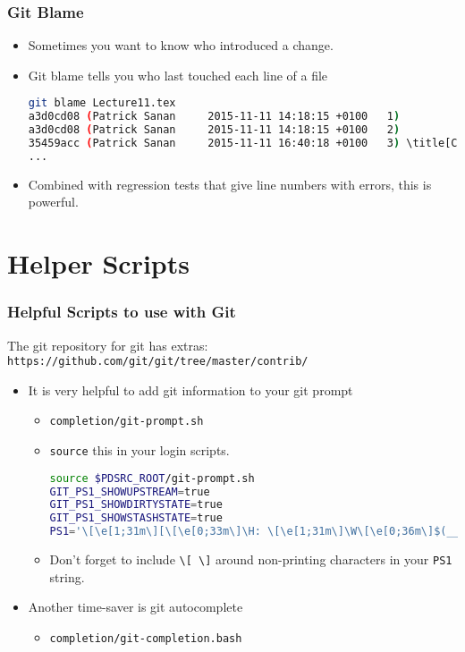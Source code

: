 \documentclass{beamer}
\begin{document}
\begin{frame}[fragile]
\frametitle{Git Blame}
\begin{itemize}
\item Sometimes you want to know who introduced a change.
\item Git blame tells you who last touched each line of a file
\begin{lstlisting}[language=bash,
basicstyle=\tiny\ttfamily]
git blame Lecture11.tex
a3d0cd08 (Patrick Sanan     2015-11-11 14:18:15 +0100   1) 
a3d0cd08 (Patrick Sanan     2015-11-11 14:18:15 +0100   2)
35459acc (Patrick Sanan     2015-11-11 16:40:18 +0100   3) \title[CEFCS Week 11]{Software Engineering for Computational Science: Week 11}
...
\end{lstlisting}
\item Combined with regression tests that give line numbers with errors, this is powerful.
\end{itemize}
\end{frame}

\section{Helper Scripts}
\begin{frame}[fragile]
\frametitle{Helpful Scripts to use with Git}
The git repository for git has extras: \texttt{https://github.com/git/git/tree/master/contrib/}
\begin{itemize}
\item It is very helpful to add git information to your git prompt
\begin{itemize}
\item \texttt{completion/git-prompt.sh}
\item \lstinline{source} this in your login scripts.
\begin{lstlisting}[language=bash]
source $PDSRC_ROOT/git-prompt.sh
GIT_PS1_SHOWUPSTREAM=true
GIT_PS1_SHOWDIRTYSTATE=true
GIT_PS1_SHOWSTASHSTATE=true
PS1='\[\e[1;31m\][\[\e[0;33m\]\H: \[\e[1;31m\]\W\[\e[0;36m\]$(__git_ps1 " (%s)")\[\e[1;31m\]]\$\[\e[0m\] '
\end{lstlisting}
\item Don't forget to include \lstinline{\[ \]} around non-printing characters in your \lstinline{PS1} string.
\end{itemize}
\item Another time-saver is git autocomplete
\begin{itemize}
\item \texttt{completion/git-completion.bash}
\end{itemize}
\end{itemize}
\end{frame}
\end{document}
